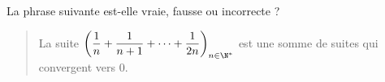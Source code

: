 La phrase suivante est-elle vraie, fausse ou incorrecte ?
\begin{quote}
  La suite $\left(\dfrac{1}{n}+ \dfrac{1}{n+1}+\cdots +\dfrac{1}{2n}\right)_{n\in\N^*}$ est une somme de suites qui convergent vers $0$.
\end{quote}
